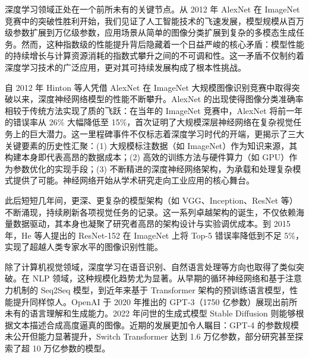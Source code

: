 \documentclass[../main.tex]{subfiles}
\begin{document}
\label{sec:ch1-preface}

\label{sec:ch1-1-research-background-and-significance}

深度学习领域正处在一个前所未有的关键节点。从 2012 年 AlexNet 在 ImageNet 竞赛中的突破性胜利开始\cite{imagenetclassificationdeep_krizhevsky_2012,imagenetlargescale_deng_2009}，我们见证了人工智能技术的飞速发展，模型规模从百万级参数扩展到万亿级参数\cite{switchtransformersscaling_fedus_2021,gpt4technical_openai_2023}，应用场景从简单的图像分类扩展到复杂的多模态生成任务\cite{highresolutionimage_rombach_2022}。然而，这种指数级的性能提升背后隐藏着一个日益严峻的核心矛盾：模型性能的持续增长与计算资源消耗的指数式攀升之间的不可调和性\cite{energypolicyconsiderations_strubell_2019,carbonfootprintmachine_patterson_2021}。这一矛盾不仅制约着深度学习技术的广泛应用，更对其可持续发展构成了根本性挑战。

\label{sec:ch1-1-1-deep-learning-overview}

自 2012 年 Hinton 等人凭借 AlexNet 在 ImageNet 大规模图像识别竞赛中取得突破以来，深度神经网络模型的性能不断攀升\cite{imagenetclassificationdeep_krizhevsky_2012}。AlexNet 的出现使得图像分类准确率相较于传统方法实现了质的飞跃：在当年的 ImageNet 竞赛中，AlexNet 将前一年的错误率从 26\% 大幅降低至 15\%，首次证明了大规模深层神经网络在复杂视觉任务上的巨大潜力\cite{imagenetclassificationdeep_krizhevsky_2012}。这一里程碑事件不仅标志着深度学习时代的开端，更揭示了三大关键要素的历史性汇聚：(1) 大规模标注数据（如 ImageNet）作为知识来源，其构建本身即代表高昂的数据成本\cite{imagenetlargescale_deng_2009}；(2) 高效的训练方法与硬件算力（如 GPU）作为参数优化的实现手段\cite{imagenetclassificationdeep_krizhevsky_2012}；(3) 不断精进的深度神经网络架构，为承载和处理复杂模式提供了可能。神经网络开始从学术研究走向工业应用的核心舞台。

此后短短几年间，更深、更复杂的模型架构（如 VGG、Inception、ResNet 等）不断涌现，持续刷新各项视觉任务的记录\cite{verydeepconvolutional_simonyan_2015,goingdeeperconvolutions_szegedy_2015,deepresiduallearning_he_2016}。这一系列卓越架构的诞生，不仅依赖海量数据驱动，其本身也凝聚了研究者高昂的架构设计与实验调优成本。到 2015 年，He 等人提出的 ResNet-152 在 ImageNet 上将 Top-5 错误率降低到不足 5\%，实现了超越人类专家水平的图像识别性能\cite{deepresiduallearning_he_2016}。

除了计算机视觉领域，深度学习在语音识别、自然语言处理等方向也取得了类似突破。在 NLP 领域，这种规模化趋势尤为显著。从早期的循环神经网络和基于注意力机制的 Seq2Seq 模型，到近年来基于 Transformer 架构的预训练语言模型，性能提升同样惊人\cite{attentionisall_vaswani_2017,bertpretraining_devlin_2019}。OpenAI 于 2020 年推出的 GPT-3（1750 亿参数）展现出前所未有的语言理解和生成能力\cite{languagemodelsare_brown_2020}。2022 年问世的生成式模型 Stable Diffusion 则能够根据文本描述合成高度逼真的图像\cite{highresolutionimage_rombach_2022}。近期的发展更加令人瞩目：GPT-4 的参数规模未公开但能力显著提升\cite{gpt4technical_openai_2023}，Switch Transformer 达到 1.6 万亿参数\cite{switchtransformersscaling_fedus_2021}，部分研究甚至探索了超 10 万亿参数的模型\cite{glamefficientscaling_du_2022}。
\end{document}

